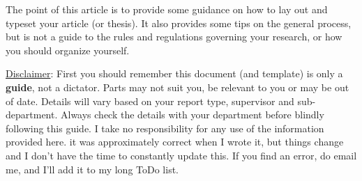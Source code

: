




The point of this article is to provide some guidance on how to lay out and 
typeset your article (or thesis).  
It also provides some tips on the general process, but is not a guide
to the rules and regulations governing your research, or how you should
organize yourself.


\underline{Disclaimer}: 
First you should remember this document (and template) is only a {\bf guide}, not a dictator. Parts may not suit you, be relevant to you or may be out of date. Details will vary based on your report type, supervisor and sub-department. Always check the details with your department before blindly following this guide. I take no responsibility for any use of the information provided here. it was approximately correct when I wrote it, but things change and I don't have the time to constantly update this. If you find an error, do email me, and I'll add it to my long ToDo list.


